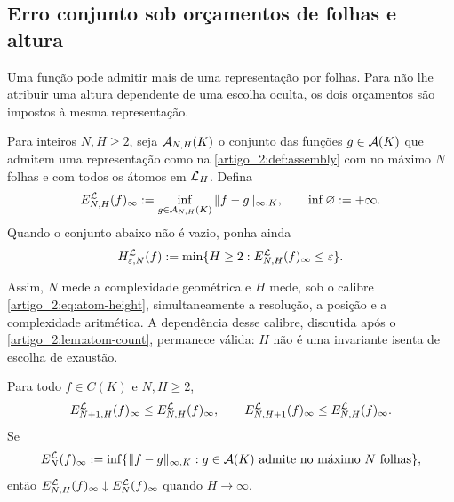 \subsection{Erro conjunto sob orçamentos de folhas e altura}
\label{artigo_2:subsec:joint-budget}

Uma função pode admitir mais de uma representação por folhas. Para não
lhe atribuir uma altura dependente de uma escolha oculta, os dois
orçamentos são impostos à mesma representação.

\begin{definition}\label{map:artigo_2:3.13}
\label{artigo_2:def:joint-error}
Para inteiros $N,H\ge2$, seja $\mathcal{A}_{N,H}(K)$ o conjunto das funções
$g\in\mathcal{A}(K)$ que admitem uma representação como na
\cref{artigo_2:def:assembly} com no máximo $N$ folhas e com todos os átomos em
$\mathcal{L}_H$. Defina
\begin{equation}
 E_{N,H}^{\mathcal{L}}(f)_\infty
 :=\inf_{g\in\mathcal{A}_{N,H}(K)}\|f-g\|_{\infty,K},
 \qquad \inf\varnothing:=+\infty.
 \label{artigo_2:eq:joint-error}
\end{equation}
Quando o conjunto abaixo não é vazio, ponha ainda
\begin{equation}
 H_{\varepsilon,N}^{\mathcal{L}}(f)
 :=\min\{H\ge2:E_{N,H}^{\mathcal{L}}(f)_\infty\le\varepsilon\}.
 \label{artigo_2:eq:height-for-accuracy}
\end{equation}
\end{definition}

Assim, $N$ mede a complexidade geométrica e $H$ mede, sob o calibre
\eqref{artigo_2:eq:atom-height}, simultaneamente a resolução, a posição e a complexidade
aritmética. A dependência desse calibre, discutida após o
\cref{artigo_2:lem:atom-count}, permanece válida: $H$ não é uma invariante isenta de
escolha de exaustão.

\begin{proposition}\label{map:artigo_2:3.14}
\label{artigo_2:prop:joint-error-monotonicity}
Para todo $f\in C(K)$ e $N,H\ge2$,
\begin{equation}
 E_{N+1,H}^{\mathcal{L}}(f)_\infty\le E_{N,H}^{\mathcal{L}}(f)_\infty,
 \qquad
 E_{N,H+1}^{\mathcal{L}}(f)_\infty\le E_{N,H}^{\mathcal{L}}(f)_\infty.
 \label{artigo_2:eq:joint-error-monotonicity}
\end{equation}
Se
\[
 E_N^{\mathcal{L}}(f)_\infty
 :=\inf\{\|f-g\|_{\infty,K}:g\in\mathcal{A}(K)
       \text{ admite no máximo $N$ folhas}\},
\]
então $E_{N,H}^{\mathcal{L}}(f)_\infty\downarrow
E_N^{\mathcal{L}}(f)_\infty$ quando $H\to\infty$.
\end{proposition}

